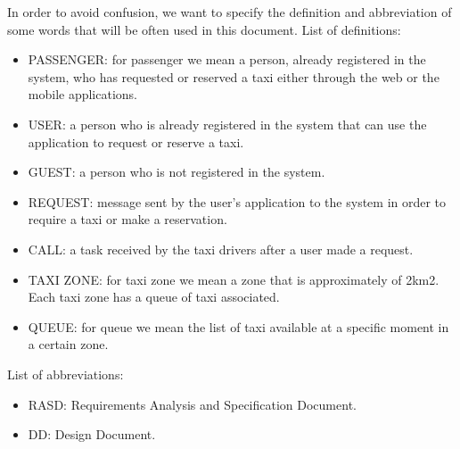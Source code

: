 In order to avoid confusion, we want to specify the definition and abbreviation of some words that will be often used in this document. 
\newline
List of definitions:
\begin{itemize}
    \item PASSENGER: for passenger we mean a person, already registered in the system, who has requested or reserved a taxi either through the web or the mobile applications.
	\item USER: a person who is already registered in the system that can use the application to request or reserve a taxi.
	\item GUEST:  a person who is not registered in the system.
	\item REQUEST: message sent by the user's application to the system in order to require a taxi or make a reservation.
	\item CALL: a task received by the taxi drivers after a user made a request.
	\item TAXI ZONE: for taxi zone we mean a zone that is approximately of 2km2. Each taxi zone has a queue of taxi associated. 
	\item QUEUE: for queue we mean the list of taxi available at a specific moment in a certain zone.
\end{itemize}

List of abbreviations:
\begin{itemize}
    \item RASD: Requirements Analysis and Specification Document.
    \item DD: Design Document.
\end{itemize}